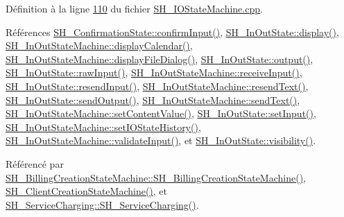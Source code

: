 Définition à la ligne \hyperlink{SH__IOStateMachine_8cpp_source_l00110}{110} du fichier \hyperlink{SH__IOStateMachine_8cpp_source}{S\-H\-\_\-\-I\-O\-State\-Machine.\-cpp}.



Références \hyperlink{classSH__ConfirmationState_ae47d89a7fc0ada8eb51d8bef2317b348}{S\-H\-\_\-\-Confirmation\-State\-::confirm\-Input()}, \hyperlink{classSH__InOutState_a918e8a7f5fe00dc16004e46eeee1281d}{S\-H\-\_\-\-In\-Out\-State\-::display()}, \hyperlink{classSH__InOutStateMachine_a0d241868828cbf9798233a8c74c69851}{S\-H\-\_\-\-In\-Out\-State\-Machine\-::display\-Calendar()}, \hyperlink{classSH__InOutStateMachine_aeddfbc098f5ee8ac05eadbaf37803fb1}{S\-H\-\_\-\-In\-Out\-State\-Machine\-::display\-File\-Dialog()}, \hyperlink{classSH__InOutState_a1a2fd4f34484125058e20730aaee7e46}{S\-H\-\_\-\-In\-Out\-State\-::output()}, \hyperlink{classSH__InOutState_a4b1ca094de91c47690ec2d1e95678273}{S\-H\-\_\-\-In\-Out\-State\-::raw\-Input()}, \hyperlink{classSH__InOutStateMachine_ab224e4a6ab99c15770bc63e1b8fdb771}{S\-H\-\_\-\-In\-Out\-State\-Machine\-::receive\-Input()}, \hyperlink{classSH__InOutState_afa791181eb61a18d4337a04827f9b200}{S\-H\-\_\-\-In\-Out\-State\-::resend\-Input()}, \hyperlink{classSH__InOutStateMachine_a526822c66b46aa0cd81ba4473fa5573f}{S\-H\-\_\-\-In\-Out\-State\-Machine\-::resend\-Text()}, \hyperlink{classSH__InOutState_ad40e929a5537eb1d4883d5aa6eee5b15}{S\-H\-\_\-\-In\-Out\-State\-::send\-Output()}, \hyperlink{classSH__InOutStateMachine_ae2cbbe3cd207158668dcb4838938c7ad}{S\-H\-\_\-\-In\-Out\-State\-Machine\-::send\-Text()}, \hyperlink{classSH__InOutStateMachine_aa2766b7a7ba39c35a10df7fc0c151b4f}{S\-H\-\_\-\-In\-Out\-State\-Machine\-::set\-Content\-Value()}, \hyperlink{classSH__InOutState_a0206ab7d5616f28b0da7bfd5451614e8}{S\-H\-\_\-\-In\-Out\-State\-::set\-Input()}, \hyperlink{classSH__InOutStateMachine_a4b72e6da839782a211692a4d728c3925}{S\-H\-\_\-\-In\-Out\-State\-Machine\-::set\-I\-O\-State\-History()}, \hyperlink{classSH__InOutStateMachine_a5a5804bd32a04d25926f6e323b906887}{S\-H\-\_\-\-In\-Out\-State\-Machine\-::validate\-Input()}, et \hyperlink{classSH__InOutState_a8c496b2fe21a51a587c6e4409c0f37ec}{S\-H\-\_\-\-In\-Out\-State\-::visibility()}.



Référencé par \hyperlink{classSH__BillingCreationStateMachine_ad62b77fa4aeafe200056ff3974562f83}{S\-H\-\_\-\-Billing\-Creation\-State\-Machine\-::\-S\-H\-\_\-\-Billing\-Creation\-State\-Machine()}, \hyperlink{classSH__ClientCreationStateMachine_a0b406b0f404c0fd33bf35be8ce0cc811}{S\-H\-\_\-\-Client\-Creation\-State\-Machine()}, et \hyperlink{classSH__ServiceCharging_afa5273d046049b1c2b020a6a19a8290b}{S\-H\-\_\-\-Service\-Charging\-::\-S\-H\-\_\-\-Service\-Charging()}.


